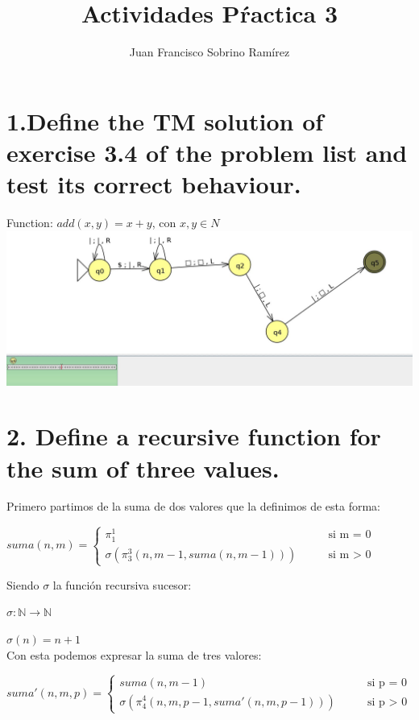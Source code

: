 \documentclass[20pt,oneside]{extbook}
\title{\Huge {Actividades Pŕactica 3}}
\author{Juan Francisco Sobrino Ramírez}
\date{}
\begin{document}
\maketitle

\newpage 
\section*{1.Define the TM solution of exercise 3.4 of the problem list and test its correct
behaviour.\\}

Function: $add(x, y) = x + y$, con   $x, y \in N $\\

\includegraphics[scale=0.55]{TM_Ej1.jpg}


 
\newpage 

\section*{2. Define a recursive function for the sum of three values.}
Primero partimos de la suma de dos valores que la definimos de esta forma:
\begin{center}
    $suma({n,m})=\left\{ 
\begin{array}{ll}
\pi^1_{1} & \qquad \text{si m = 0}   \\
\sigma (\pi^3_{3}(n,m-1,suma({n,m-1}))) & \qquad \text {si m $>$ 0}
\end{array}\right.$
\end{center}

Siendo $\sigma$ la función recursiva sucesor:

$\sigma: \mathbb{N} \to \mathbb{N}$

$\sigma(n)=n+1$\\

Con esta podemos expresar la suma de tres valores:
\begin{center}
    $suma'({n,m,p})=\left\{ 
\begin{array}{ll}
suma({n,m-1}) & \qquad \text{si p = 0}   \\
\sigma (\pi^4_{4}(n,m,p-1,suma'({n,m,p-1}))) & \qquad \text {si p $>$ 0}
\end{array}\right.$
\end{center}
\end{document}
